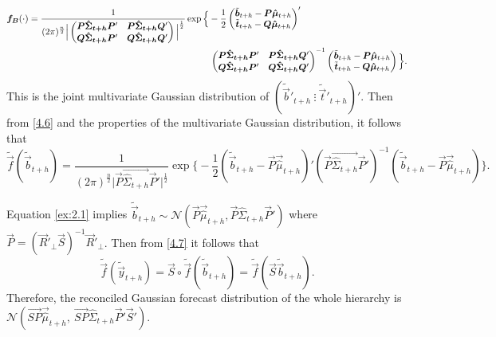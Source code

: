 \documentclass[graybox]{svmult}
\begin{document}
\begin{align*}
\vec{f_B}(\cdot)&=\frac{1}{(2\pi)^{\frac{n}{2}}\Big|\begin{pmatrix}
	\vec{P}\vec{\hat{\Sigma}_{t+h}}\vec{P}' & \vec{P}\vec{\hat{\Sigma}_{t+h}}\vec{Q}' \\
	\vec{Q}\vec{\hat{\Sigma}_{t+h}}\vec{P}' & \vec{Q}\vec{\hat{\Sigma}_{t+h}}\vec{Q}'
	\end{pmatrix}\Big|^{\frac{1}{2}}}
\exp \Big\{-\frac{1}{2} \begin{pmatrix}\tilde{\vec{b}}_{t+h} - \vec{P}\vec{\hat{\mu}}_{t+h}\\ \tilde{\vec{t}}_{t+h}- \vec{Q}\vec{\hat{\mu}}_{t+h}\end{pmatrix}'\\
&\hspace*{7cm}\begin{pmatrix}
\vec{P}\vec{\hat{\Sigma}_{t+h}}\vec{P}' & \vec{P}\vec{\hat{\Sigma}_{t+h}}\vec{Q}' \\
\vec{Q}\vec{\hat{\Sigma}_{t+h}}\vec{P}' & \vec{Q}\vec{\hat{\Sigma}_{t+h}}\vec{Q}'
\end{pmatrix}^{-1}
\begin{pmatrix}\tilde{\vec{b}}_{t+h} - \vec{P}\vec{\hat{\mu}}_{t+h}\\ \tilde{\vec{t}}_{t+h}- \vec{Q}\vec{\hat{\mu}}_{t+h}\end{pmatrix} \Big\}.
\end{align*}
This is the joint multivariate Gaussian distribution of $(\tilde{\vec{b}}'_{t+h} ~ \vdots~ \tilde{\vec{t}}'_{t+h})'$. Then from \eqref{4.6} and the properties of the multivariate Gaussian distribution, it follows that
\begin{equation}\label{ex:2.1}
\tilde{\vec{f}}(\tilde{\vec{b}}_{t+h})=\frac{1}{(2\pi)^{\frac{n}{2}}\Big|\vec{P}\vec{\hat{\Sigma}_{t+h}}\vec{P}'\Big|^{\frac{1}{2}}}
\exp \Big\{-\frac{1}{2} (\tilde{\vec{b}}_{t+h} - \vec{P}\vec{\hat{\mu}}_{t+h})' (\vec{P}\vec{\hat{\Sigma}_{t+h}}\vec{P}')^{-1}(\tilde{\vec{b}}_{t+h} - \vec{P}\vec{\hat{\mu}}_{t+h}) \Big\}.
\end{equation}

Equation \eqref{ex:2.1} implies $\tilde{\vec{b}}_{t+h} \sim \mathscr{N}(\vec{P}\vec{\hat{\mu}}_{t+h}, \vec{P}\hat{\Sigma}_{t+h}\vec{P}')$ where $\vec{P} = (\vec{R}'_\bot \vec{S})^{-1}\vec{R}'_\bot$. Then from \eqref{4.7} it follows that
\begin{equation}
\tilde{\vec{f}}(\tilde{\vec{y}}_{t+h})=\vec{S}\circ\tilde{\vec{f}}(\tilde{\vec{b}}_{t+h})=\tilde{\vec{f}}(\vec{S}\tilde{\vec{b}}_{t+h}).
\end{equation}
Therefore, the reconciled Gaussian forecast distribution of the whole hierarchy is\\
$\mathscr{N}(\vec{SP}\vec{\hat{\mu}}_{t+h},~ \vec{SP}\hat{\Sigma}_{t+h}\vec{P}'\vec{S}')$.
\end{document}
